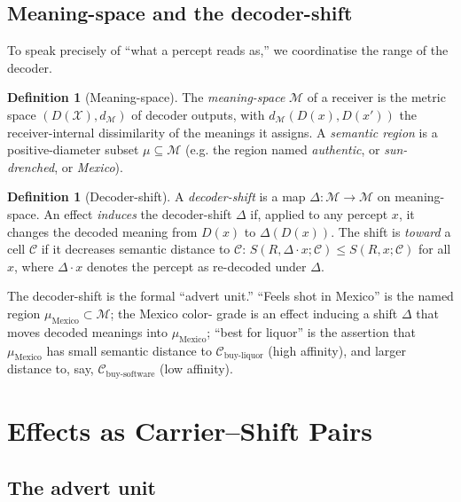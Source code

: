 \documentclass[twocolumn,11pt,a4paper]{article}
\theoremstyle{adv}
\theoremstyle{definition}
\newtheorem{definition}[theorem]{Definition}
\theoremstyle{remark}
\newcommand{\Out}{\mathcal{X}}         %
\newcommand{\Cell}{\mathcal{C}}        %
\newcommand{\Dec}{D}                   %
\newcommand{\Recv}{R}                  %
\newcommand{\Sval}{S}                  %
\newcommand{\Mean}{\mathcal{M}}        %
\newcommand{\shift}{\Delta}            %
\newcommand{\dist}{d}
\begin{document}
\subsection{Meaning-space and the decoder-shift}

To speak precisely of ``what a percept reads as,'' we coordinatise the
range of the decoder.

\begin{definition}[Meaning-space]
\label{def:meaning}
The \emph{meaning-space} $\Mean$ of a receiver is the metric space
$(\Dec(\Out),\dist_{\Mean})$ of decoder outputs, with
$\dist_{\Mean}(\Dec(x),\Dec(x'))$ the receiver-internal dissimilarity of
the meanings it assigns. A \emph{semantic region} is a positive-diameter
subset $\mu\subseteq\Mean$ (e.g. the region named \emph{authentic},
or \emph{sun-drenched}, or \emph{Mexico}).
\end{definition}

\begin{definition}[Decoder-shift]
\label{def:shift}
A \emph{decoder-shift} is a map $\shift:\Mean\to\Mean$ on meaning-space. An
effect \emph{induces} the decoder-shift $\shift$ if, applied to any percept
$x$, it changes the decoded meaning from $\Dec(x)$ to
$\shift(\Dec(x))$. The shift is \emph{toward} a cell $\Cell$ if it
decreases semantic distance to $\Cell$:
$\Sval(\Recv,\shift\!\cdot x;\Cell)\le \Sval(\Recv,x;\Cell)$ for all $x$,
where $\shift\!\cdot x$ denotes the percept as re-decoded under $\shift$.
\end{definition}

The decoder-shift is the formal ``advert unit.'' ``Feels shot in Mexico''
is the named region $\mu_{\text{Mexico}}\subset\Mean$; the Mexico color-
grade is an effect inducing a shift $\shift$ that moves decoded meanings
into $\mu_{\text{Mexico}}$; ``best for liquor'' is the assertion that
$\mu_{\text{Mexico}}$ has small semantic distance to
$\Cell_{\text{buy-liquor}}$ (high affinity), and larger distance to,
say, $\Cell_{\text{buy-software}}$ (low affinity).

\section{Effects as Carrier--Shift Pairs}
\label{sec:effects}

\subsection{The advert unit}
\end{document}
